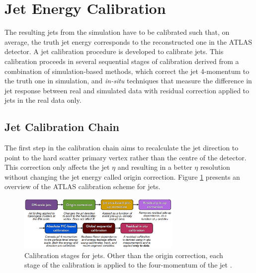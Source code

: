 \section{Jet Energy Calibration}
\label{Jet:Cal}
The resulting jets from the simulation have to be calibrated such that, on average, the truth jet energy corresponds to the reconstructed one in the ATLAS detector. A jet calibration procedure is developed to calibrate jets. This calibration proceeds in several sequential stages of calibration derived from a combination of simulation-based methods, which correct the jet 4-momentum to the truth one in simulation, and \textit{in-situ} techniques that measure the difference in jet response between real and simulated data with residual correction applied to jets in the real data only.

\subsection{Jet Calibration Chain}
\label{Jet:Cal:chain}
The first step in the calibration chain aims to recalculate the jet direction to point to the hard scatter primary vertex rather than the centre of the detector. This correction only affects the jet $\eta$ and resulting in a better $\eta$ resolution without changing the jet energy called origin correction. Figure \ref{fig:Jet:Cal:chain} presents an overview of the ATLAS calibration scheme for jets.
\begin{figure}[htbp]
     \centering
     \includegraphics[width=0.7\textwidth]{Ch4/Img/calibration_chain.png}
     \caption{Calibration stages for jets. Other than the origin correction, each stage of the calibration is applied to the four-momentum of the jet \cite{JES_Sys_13_TeV}.}
     \label{fig:Jet:Cal:chain}
 \end{figure}

